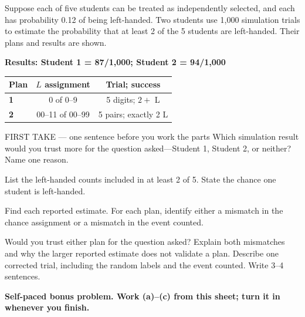 \documentclass[14pt]{extarticle}
\begin{document}
\pagestyle{empty}


\noindent\begin{minipage}[t]{0.57\linewidth}
\vspace{0pt}
Suppose each of five students can be treated as independently selected, and each has probability 0.12 of being left-handed. Two students use 1,000 simulation trials to estimate the probability that at least 2 of the 5 students are left-handed. Their plans and results are shown.\par
\end{minipage}\hfill
\begin{minipage}[t]{0.40\linewidth}
\vspace{0pt}
\begin{center}
\textbf{Results: Student 1 = 87/1,000; Student 2 = 94/1,000}\par\smallskip
\begin{tabular}{|l|c|c|}
\hline
\textbf{Plan} & \textbf{$L$ assignment} & \textbf{Trial; success} \\ \hline
\textbf{1} & 0 of 0--9 & 5 digits; $2+$ L \\ \hline
\textbf{2} & 00--11 of 00--99 & 5 pairs; exactly 2 L \\ \hline
\end{tabular}
\end{center}
\end{minipage}

\begin{firsttakebox}{FIRST TAKE --- one sentence before you work the parts}
Which simulation result would you trust more for the question asked---Student 1, Student 2, or neither? Name one reason.
\end{firsttakebox}

\begin{description}[leftmargin=1.15in, labelwidth=1in, itemsep=2pt, topsep=2pt]
  \item[\dokbadge{1}~(a)] List the left-handed counts included in at least 2 of 5. State the chance one student is left-handed.
  \item[\dokbadge{2}~(b)] Find each reported estimate. For each plan, identify either a mismatch in the chance assignment or a mismatch in the event counted.
  \item[\dokbadge{3}~(c)] Would you trust either plan for the question asked? Explain both mismatches and why the larger reported estimate does not validate a plan. Describe one corrected trial, including the random labels and the event counted. Write 3--4 sentences.
\end{description}

\vfill
\textbf{Self-paced bonus problem. Work (a)--(c) from this sheet; turn it in whenever you finish.}
\end{document}
